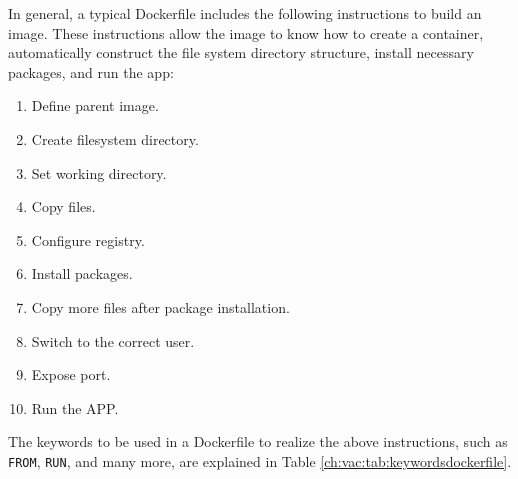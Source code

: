 In general, a typical Dockerfile includes the following instructions to build an image. These instructions allow the image to know how to create a container, automatically construct the file system directory structure, install necessary packages, and run the app:
\begin{enumerate}[(1)]
  \item Define parent image.
  \item Create filesystem directory.
  \item Set working directory.
  \item Copy files.
  \item Configure registry.
  \item Install packages.
  \item Copy more files after package installation.
  \item Switch to the correct user.
  \item Expose port.
  \item Run the APP.
\end{enumerate}

The keywords to be used in a Dockerfile to realize the above instructions, such as \verb|FROM|, \verb|RUN|, and many more, are explained in Table \ref{ch:vac:tab:keywordsdockerfile}.

